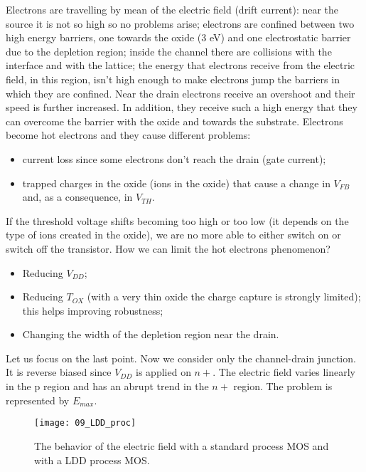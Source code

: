 \documentclass[a4paper, 12pt, twoside, openright]{report}
\begin{document}
\begin{enumerate}
Electrons are travelling by mean of the electric field (drift current): near the source it is not so high so no problems arise; electrons are confined between two high energy barriers, one towards the oxide (3 eV) and one electrostatic barrier due to the depletion region; inside the channel there are collisions with the interface and with the lattice; the energy that electrons receive from the electric field, in this region, isn't high enough to make electrons jump the barriers in which they are confined. Near the drain electrons receive an overshoot and their speed is further increased. In addition, they receive such a high energy that they can overcome the barrier with the oxide and towards the substrate. Electrons become hot electrons and they cause different problems:

\begin{itemize}
\item current loss since some electrons don't reach the drain (gate current);
\item trapped charges in the oxide (ions in the oxide) that cause a change in $V_{FB}$ and, as a consequence, in $V_{TH}$.
\end{itemize}

If the threshold voltage shifts becoming too high or too low (it depends on the type of ions created in the oxide), we are no more able to either switch on or switch off the transistor. How we can limit the hot electrons phenomenon?

\begin{itemize}
\item Reducing $V_{DD}$;
\item Reducing $T_{OX}$ (with a very thin oxide the charge capture is strongly limited); this helps improving robustness;
\item Changing the width of the depletion region near the drain.
\end{itemize}

Let us focus on the last point. Now we consider only the channel-drain junction. It is reverse biased since $V_{DD}$ is applied on $n+$. The electric field varies linearly in the p region and has an abrupt trend in the $n+$ region. The problem is represented by $E_{max}$.

	\begin{figure}[H]
	\centering
	\texttt{[image: 09\_LDD\_proc]}
	\caption{The behavior of the electric field with a standard process MOS and with a LDD process MOS.}
	\label{}
	\end{figure}


\end{enumerate}
\end{document}
